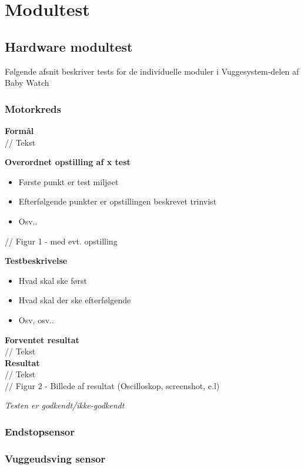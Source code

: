 \section{Modultest}
\subsection{Hardware modultest}
Følgende afsnit beskriver tests for de individuelle moduler i Vuggesystem-delen af Baby Watch
\subsubsection{Motorkreds}
\textbf{Formål} \\
// Tekst

\textbf{Overordnet opstilling af x test}

\begin{itemize}
	\item Første punkt er test miljøet
	\item Efterfølgende punkter er opstillingen beskrevet trinvist
	\item Osv..
\end{itemize}

// Figur 1 - med evt. opstilling

\textbf{Testbeskrivelse}
\begin{itemize}
	\item Hvad skal ske først
	\item Hvad skal der ske efterfølgende
	\item Osv, osv..
\end{itemize}

\textbf{Forventet resultat} \\
// Tekst \\
\textbf{Resultat} \\
// Tekst \\

// Figur 2 - Billede af resultat (Oscilloskop, screenshot, e.l)

\textit{Testen er godkendt/ikke-godkendt}



\subsubsection{Endstopsensor}

\subsubsection{Vuggeudsving sensor}

